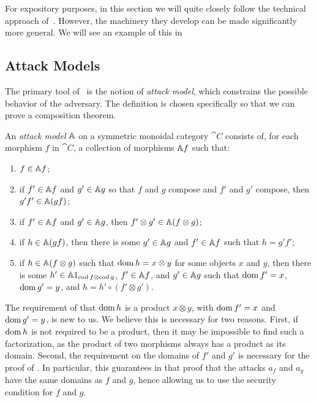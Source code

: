 For expository purposes, in this section we will quite closely follow the
technical approach of~\cite{broadbent-karvonen-2022}. However, the machinery
they develop can be made significantly more general. We will see an example of
this in 

\subsection{Attack Models}
\label{sec:attack-models}

The primary tool of~\cite{broadbent-karvonen-2022} is the notion of \emph{attack
model}, which constrains the possible behavior of the adversary. The definition
is chosen specifically so that we can prove a composition theorem.

\begin{dfn}
  An \emph{attack model} $\AA$ on a symmetric monoidal category $\cat{C}$
  consists of, for each morphism $f$ in $\cat{C}$, a collection of morphisms
  $\AA f$ such that:
  \begin{enumerate}
    \item \label{item:am-id} $f\in \AA f$;
    \item \label{item:am-seq-comp} if $f'\in\AA f$ and $g'\in\AA g$ so that $f$ and $g$ compose and $f'$
      and $g'$ compose, then $g'f'\in\AA (gf)$;
    \item \label{item:am-con-comp} if $f'\in\AA f$ and $g'\in\AA g$, then $f'\otimes g'\in\AA (f\otimes
      g)$;
    \item \label{item:am-seq-fact} if $h\in\AA (gf)$, then there is some $g'\in\AA g$ and $f'\in\AA f$ such
      that $h = g'f'$;
    \item \label{item:am-con-fact} if $h\in\AA (f\otimes g)$ such that
      $\dom h = x\otimes y$ for some objects $x$ and $y$, then there is some $h'\in\AA 1_{\cod
      f\otimes\cod g}$, $f'\in\AA f$, and $g'\in\AA g$ such that $\dom f' = x$,
      $\dom g' = y$, and $h = h'\circ (f'\otimes g')$.
  \end{enumerate}
\end{dfn}

\begin{rmk}\label{rmk:issue}
  The requirement of  that $\dom h$ is a product
  $x\otimes y$, with $\dom f' = x$ and $\dom g' = y$, is new to us. We believe this is
  necessary for two reasons. First, if $\dom h$ is not required to be a product,
  then it may be impossible to find such a factorization, as the product of two
  morphisms always has a product as its domain. Second, the requirement
  on the domains of $f'$ and $g'$ is necessary for the proof of
  . In particular, this guarantees
  in that proof that the attacks $a_f$ and $a_g$ have the same domains as $f$
  and $g$, hence allowing us to use the security condition for $f$ and $g$.
\end{rmk}


